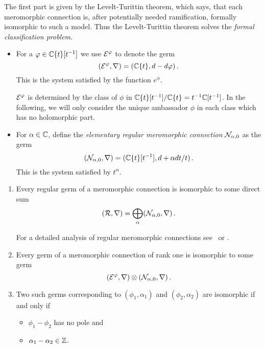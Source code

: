 The first part is given by the Levelt-Turittin theorem, which says, that
each meromorphic connection is, after potentially needed ramification, formally
isomorphic to such a model.
Thus the Levelt-Turittin theorem solves the \emph{formal classification
problem}.
\begin{defn}
  \begin{itemize}
    \item For a $\varphi\in\mathbb{C}\{t\}[t^{-1}]$ we use $\mathcal{E}^{\varphi}$ to denote the germ
      \[
        (\mathcal{E}^{\varphi},\nabla)=(\mathbb{C}\{t\},d-d\varphi)\,.
      \]
      This is the system satisfied by the function $e^\phi$.
      \begin{s-cor}
        $\mathcal{E}^\varphi$ is determined by the class of $\phi$ in
        $\mathbb{C}\{t\}[t^{-1}]/\mathbb{C}\{t\}=t^{-1}\mathbb{C}[t^{-1}]$. In the following, we will
        only consider the unique ambassador $\phi$ in each class which has no
        holomorphic part.
      \end{s-cor}
    \item For $\alpha\in\mathbb{C}$, define the \emph{elementary regular meromorphic
      connection} $\mathcal{N}_{\alpha,0}$ as the germ
      \[
        (\mathcal{N}_{\alpha,0},\nabla)=(\mathbb{C}\{t\}[t^{-1}],d+\alpha dt/t)\,.
      \]
      This is the system satisfied by $t^\alpha$\TODO[?].
  \end{itemize}
\end{defn}
\begin{prop}
  \begin{enumerate}
    \item Every regular germ of a meromorphic connection is isomorphic to some
      direct sum
      \[
        (\mathcal{R},\nabla)=\bigoplus_\alpha(\mathcal{N}_{\alpha,0},\nabla)\,.
      \]
      \begin{s-rem}
        For a detailed analysis of regular meromorphic connections
        see~\cite[Sec.II.2]{sabbah2007isomonodromic} or
        \cite[Sec.5.2]{hotta2008}.
      \end{s-rem}
    \item Every germ of a meromorphic connection of rank one is isomorphic to
      some germ
      \[
        (\mathcal{E}^\varphi,\nabla)\otimes(\mathcal{N}_{\alpha,0},\nabla) \,.
      \]
    \item Two such germs corresponding to $(\phi_1,\alpha_1)$ and
      $(\phi_2,\alpha_2)$ are isomorphic if and only if
      \begin{itemize}
        \item $\phi_1-\phi_2$ has no pole and
        \item $\alpha_1-\alpha_2\in\mathbb{Z}$.
      \end{itemize}
  \end{enumerate}
\end{prop}
